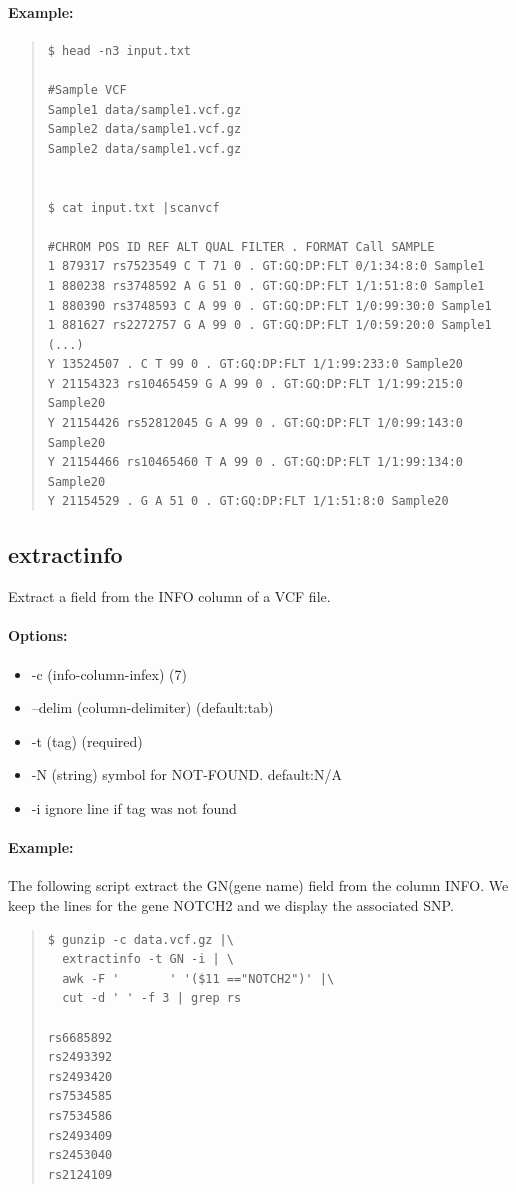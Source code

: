\documentclass[12pt]{article}
\begin{document}
\paragraph{Example:}
\begin{quote}
\begin{verbatim}
$ head -n3 input.txt

#Sample	VCF
Sample1	data/sample1.vcf.gz
Sample2	data/sample1.vcf.gz
Sample2	data/sample1.vcf.gz


$ cat input.txt |scanvcf 

#CHROM POS ID REF ALT QUAL FILTER . FORMAT Call SAMPLE
1 879317 rs7523549 C T 71 0 . GT:GQ:DP:FLT 0/1:34:8:0 Sample1
1 880238 rs3748592 A G 51 0 . GT:GQ:DP:FLT 1/1:51:8:0 Sample1
1 880390 rs3748593 C A 99 0 . GT:GQ:DP:FLT 1/0:99:30:0 Sample1
1 881627 rs2272757 G A 99 0 . GT:GQ:DP:FLT 1/0:59:20:0 Sample1
(...)
Y 13524507 . C T 99 0 . GT:GQ:DP:FLT 1/1:99:233:0 Sample20
Y 21154323 rs10465459 G A 99 0 . GT:GQ:DP:FLT 1/1:99:215:0 Sample20
Y 21154426 rs52812045 G A 99 0 . GT:GQ:DP:FLT 1/0:99:143:0 Sample20
Y 21154466 rs10465460 T A 99 0 . GT:GQ:DP:FLT 1/1:99:134:0 Sample20
Y 21154529 . G A 51 0 . GT:GQ:DP:FLT 1/1:51:8:0 Sample20
\end{verbatim}
\end{quote}


\subsection{extractinfo}
Extract a field from the INFO column of a VCF file.
\paragraph{Options:}
\begin{itemize}
\item-c (info-column-infex) (7)
\item--delim (column-delimiter) (default:tab)
\item-t (tag) (required)
\item-N (string) symbol for NOT-FOUND. default:N/A
\item-i ignore line if tag was not found
\end{itemize}
\paragraph{Example:}
The following script extract the GN(gene name) field from the column INFO. We keep the lines for the gene NOTCH2 and we display the associated SNP.
\begin{quote}
\begin{verbatim}
$ gunzip -c data.vcf.gz |\
  extractinfo -t GN -i | \
  awk -F '       ' '($11 =="NOTCH2")' |\
  cut -d ' ' -f 3 | grep rs

rs6685892
rs2493392
rs2493420
rs7534585
rs7534586
rs2493409
rs2453040
rs2124109

\end{verbatim}
\end{quote}
\end{document}
